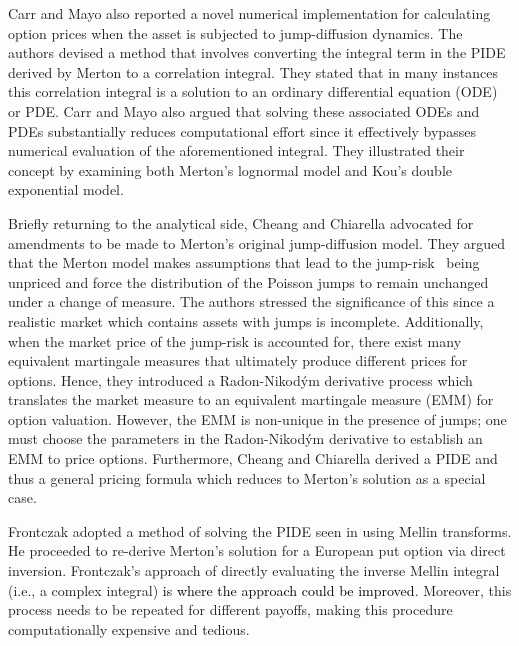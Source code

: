 Carr and Mayo \cite{Carr2007} also reported a novel numerical implementation for calculating option prices when the asset is subjected to jump-diffusion dynamics. The authors devised a method that involves converting the integral term in the PIDE derived by Merton \cite{Merton1976} to a correlation integral. They stated that in many instances this correlation integral is a solution to an ordinary differential equation (ODE) or PDE. Carr and Mayo also argued that solving these associated ODEs and PDEs substantially reduces computational effort since it effectively bypasses numerical evaluation of the aforementioned integral. They illustrated their concept by examining both Merton's lognormal model and Kou's double exponential model.

Briefly returning to the analytical side, Cheang and Chiarella \cite{Cheang2011} advocated for amendments to be made to Merton's original jump-diffusion model. They argued that the Merton model makes assumptions that lead to the jump-risk~\cite{Gibson2001} being unpriced and force the distribution of the Poisson jumps to remain unchanged under a change of measure. The authors stressed the significance of this since a realistic market which contains assets with jumps is incomplete. Additionally, when the market price of the jump-risk is accounted for, there exist many equivalent martingale measures that ultimately produce different prices for options. Hence, they introduced a Radon-Nikod\'{y}m derivative process which translates the market measure to an equivalent martingale measure (EMM) for option valuation. However, the EMM is non-unique in the presence of jumps; one must choose the parameters in the Radon-Nikod\'{y}m derivative to establish an EMM to price options. Furthermore, Cheang and Chiarella derived a PIDE and thus a general pricing formula which reduces to Merton's solution \cite{Merton1976} as a special case.

Frontczak \cite{Frontczak2013} adopted a method of solving the PIDE seen in \cite{Merton1976} using Mellin transforms. He proceeded to re-derive Merton's solution for a European put option via direct inversion. Frontczak's approach of directly evaluating the inverse Mellin integral (i.e., a complex integral) \textcolor{black}{is where the approach could be improved}. Moreover, this process needs to be repeated for different payoffs, making this procedure computationally expensive and tedious.
	
	
